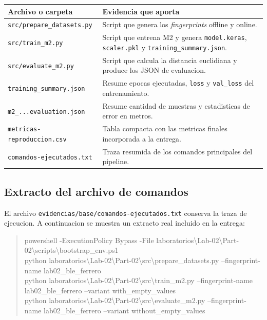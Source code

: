 \documentclass[11pt,a4paper]{article}
\begin{document}
\begin{center}
\small
\begin{tabular}{>{\raggedright\arraybackslash}p{3.9cm}p{9.0cm}}
\toprule
Archivo o carpeta & Evidencia que aporta \\
\midrule
\texttt{src/prepare\_datasets.py} & Script que genera los \textit{fingerprints} offline y online. \\
\texttt{src/train\_m2.py} & Script que entrena M2 y genera \texttt{model.keras}, \texttt{scaler.pkl} y \texttt{training\_summary.json}. \\
\texttt{src/evaluate\_m2.py} & Script que calcula la distancia euclidiana y produce los JSON de evaluacion. \\
\texttt{training\_summary.json} & Resume epocas ejecutadas, \texttt{loss} y \texttt{val\_loss} del entrenamiento. \\
\texttt{m2\_...evaluation.json} & Resume cantidad de muestras y estadisticas de error en metros. \\
\texttt{metricas-reproduccion.csv} & Tabla compacta con las metricas finales incorporada a la entrega. \\
\texttt{comandos-ejecutados.txt} & Traza resumida de los comandos principales del pipeline. \\
\bottomrule
\end{tabular}
\end{center}

\subsection*{Extracto del archivo de comandos}
El archivo \texttt{evidencias/base/comandos-ejecutados.txt} conserva la traza de ejecucion. A continuacion se muestra un extracto real incluido en la entrega:

\begin{quote}
\ttfamily\footnotesize
powershell -ExecutionPolicy Bypass -File laboratorios\textbackslash Lab-02\textbackslash Part-02\textbackslash scripts\textbackslash bootstrap\_env.ps1\\
python laboratorios\textbackslash Lab-02\textbackslash Part-02\textbackslash src\textbackslash prepare\_datasets.py --fingerprint-name lab02\_ble\_ferrero\\
python laboratorios\textbackslash Lab-02\textbackslash Part-02\textbackslash src\textbackslash train\_m2.py --fingerprint-name lab02\_ble\_ferrero --variant with\_empty\_values\\
python laboratorios\textbackslash Lab-02\textbackslash Part-02\textbackslash src\textbackslash evaluate\_m2.py --fingerprint-name lab02\_ble\_ferrero --variant without\_empty\_values
\end{quote}
\end{document}
